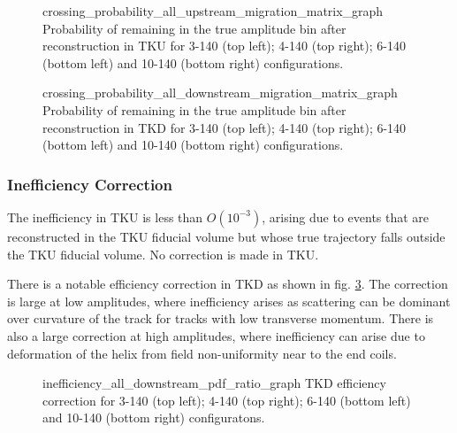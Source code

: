 \begin{figure}[!tbh]
                     {crossing_probability_all_upstream_migration_matrix_graph}
            {Probability of remaining in the true amplitude bin after 
             reconstruction in TKU for 3-140 (top left); 4-140 (top right); 
             6-140 (bottom left) and 10-140 (bottom right) configurations.
             \label{fig:crossing_probability_diagonal_tku}}
\end{figure}

\begin{figure}[!tbh]
                     {crossing_probability_all_downstream_migration_matrix_graph}
            {Probability of remaining in the true amplitude bin after 
             reconstruction in TKD for 3-140 (top left); 4-140 (top right); 
             6-140 (bottom left) and 10-140 (bottom right) configurations.
             \label{fig:crossing_probability_diagonal_tkd}}
\end{figure}

\subsubsection{Inefficiency Correction}
\label{sec:inefficiency}

The inefficiency in TKU is less than $O(10^{-3})$, arising due to events that are 
reconstructed in the TKU fiducial volume but whose true trajectory falls outside 
the TKU fiducial volume. No correction is made in TKU.

There is a notable efficiency correction in TKD as shown in 
fig. \ref{fig:inefficiency_tkd}. The correction is large at low amplitudes, 
where inefficiency arises as scattering can be dominant over curvature of the 
track for tracks with low transverse momentum. There is also a large correction
at high amplitudes, where inefficiency can arise due to deformation of the helix
from field non-uniformity near to the end coils.

\begin{figure}[!tbh]
                     {inefficiency_all_downstream_pdf_ratio_graph}
            {TKD efficiency correction for 3-140 (top left); 4-140 (top right); 
             6-140 (bottom left) and 10-140 (bottom right) configuratons.
             \label{fig:inefficiency_tkd}}
\end{figure}

